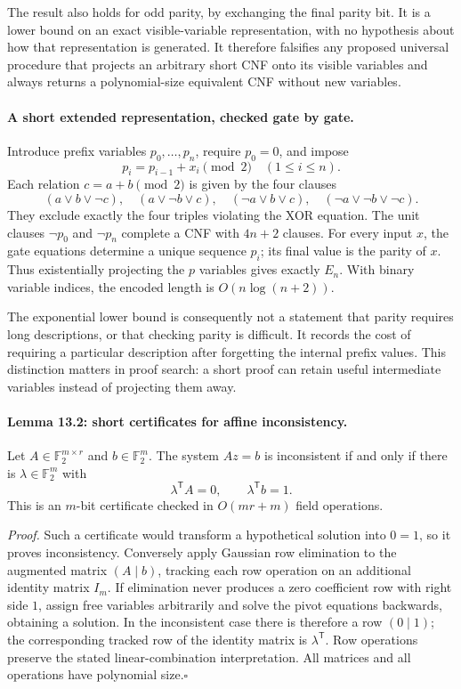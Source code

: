 \documentclass[11pt]{article}
\begin{document}
The result also holds for odd parity, by exchanging the final parity bit.
It is a lower bound on an exact visible-variable representation, with no
hypothesis about how that representation is generated. It therefore falsifies
any proposed universal procedure that projects an arbitrary short CNF onto
its visible variables and always returns a polynomial-size equivalent CNF
without new variables.

\paragraph{A short extended representation, checked gate by gate.}
Introduce prefix variables $p_0,\ldots,p_n$, require $p_0=0$, and impose
\[
                   p_i=p_{i-1}+x_i\pmod2\quad(1\le i\le n).
\]
Each relation $c=a+b\pmod2$ is given by the four clauses
\[
 (a\vee b\vee\neg c),\quad
 (a\vee\neg b\vee c),\quad
 (\neg a\vee b\vee c),\quad
 (\neg a\vee\neg b\vee\neg c).
\]
They exclude exactly the four triples violating the XOR equation. The unit
clauses $\neg p_0$ and $\neg p_n$ complete a CNF with $4n+2$ clauses.
For every input $x$, the gate equations determine a unique sequence $p_i$;
its final value is the parity of $x$. Thus existentially projecting the
$p$ variables gives exactly $E_n$. With binary variable indices, the encoded
length is $O(n\log(n+2))$.

The exponential lower bound is consequently not a statement that parity
requires long descriptions, or that checking parity is difficult. It records
the cost of requiring a particular description after forgetting the internal
prefix values. This distinction matters in proof search: a short proof can
retain useful intermediate variables instead of projecting them away.

\paragraph{Lemma 13.2: short certificates for affine inconsistency.}
Let $A\in\mathbb F_2^{m\times r}$ and $b\in\mathbb F_2^m$. The system
$Az=b$ is inconsistent if and only if there is
$\lambda\in\mathbb F_2^m$ with
\begin{equation}\label{a13:dual}
                  \lambda^{\mathsf T}A=0,
                  \qquad\lambda^{\mathsf T}b=1.
\end{equation}
This is an $m$-bit certificate checked in $O(mr+m)$ field operations.

\emph{Proof.} Such a certificate would transform a hypothetical solution
into $0=1$, so it proves inconsistency. Conversely apply Gaussian row
elimination to the augmented matrix $(A\mid b)$, tracking each row operation
on an additional identity matrix $I_m$. If elimination never produces a zero
coefficient row with right side $1$, assign free variables arbitrarily and
solve the pivot equations backwards, obtaining a solution. In the
inconsistent case there is therefore a row $(0\mid1)$; the corresponding
tracked row of the identity matrix is $\lambda^{\mathsf T}$. Row operations
preserve the stated linear-combination interpretation. All matrices and all
operations have polynomial size.\hfill$\square$
\end{document}
